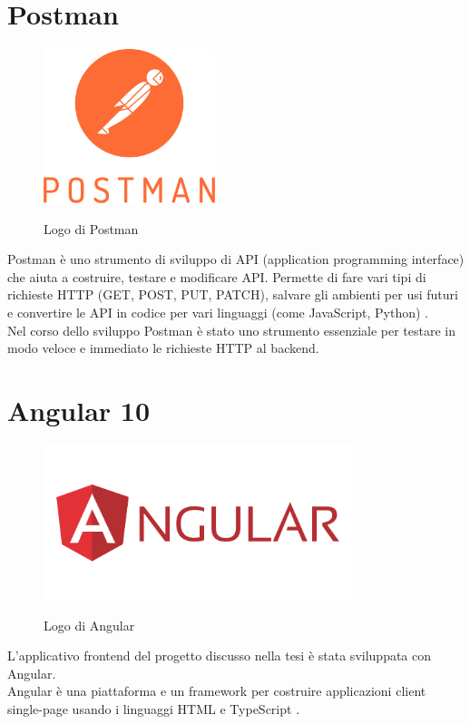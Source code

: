 \section{Postman}
\begin{figure}[h]
\begin{center}
  \includegraphics[width=5cm]{images/postman_logo.png}\\
  \caption{Logo di Postman}\label{fig:git}
\end{center}
\end{figure}
\FloatBarrier
Postman è uno strumento di sviluppo di API (application programming interface) che aiuta a costruire, testare e modificare API. Permette di fare vari tipi di richieste HTTP (GET, POST, PUT, PATCH), salvare gli ambienti per usi futuri e convertire le API in codice per vari linguaggi (come JavaScript, Python) \cite{POSTMAN}.\\
Nel corso dello sviluppo Postman è stato uno strumento essenziale per testare in modo veloce e immediato le richieste HTTP al backend.


\section{Angular 10}
\begin{figure}[h]
\begin{center}
  \includegraphics[width=9cm]{images/angular_logo.png}\\
  \caption{Logo di Angular}\label{fig:git}
\end{center}
\end{figure}
\FloatBarrier
L'applicativo frontend del progetto discusso nella tesi è stata sviluppata con Angular.\\
Angular è una piattaforma e un framework per costruire applicazioni client single-page usando i linguaggi HTML e TypeScript \cite{ANGULAR}. 
